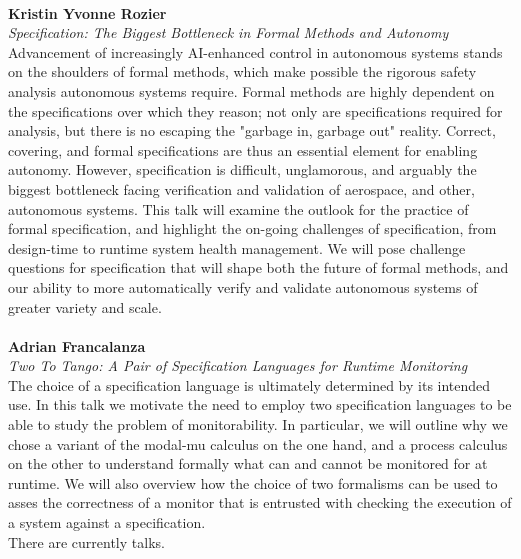 \documentclass{article}
\newcounter{talkc}
\newcommand{\talk}[3]{\stepcounter{talkc}
\vspace{0.5em}~\\
\noindent
\textbf{#1}\\ 
\noindent\emph{#2}\\ 
\noindent#3\\
}
\begin{document}
\talk{Kristin Yvonne Rozier}{Specification: The Biggest Bottleneck in Formal Methods and Autonomy}{Advancement of increasingly AI-enhanced control in autonomous systems stands on the shoulders of formal methods, which make possible the rigorous safety analysis autonomous systems require. Formal methods are highly dependent on the specifications over which they reason; not only are specifications required for analysis, but there is no escaping the "garbage in, garbage out" reality. Correct, covering, and formal specifications are thus an essential element for enabling autonomy. However, specification is difficult, unglamorous, and arguably the biggest bottleneck facing verification and validation of aerospace, and other, autonomous systems. This talk will examine the outlook for the practice of formal specification, and highlight the on-going challenges of specification, from design-time to runtime system health management. We will pose challenge questions for specification that will shape both the future of formal methods, and our ability to more automatically verify and validate autonomous systems of greater variety and scale.}
%
\talk{Adrian Francalanza}{Two To Tango: A Pair of Specification Languages for Runtime Monitoring}{The choice of a specification language is ultimately determined by its intended use.  In this talk we motivate the need to employ two specification languages to be able to study the problem of monitorability.  In particular, we will outline why we chose a variant of the modal-mu calculus on the one hand, and a process calculus on the other to understand formally what can and cannot be monitored for at runtime.  We will also overview how the choice of two formalisms can be used to asses the correctness of a monitor that is entrusted with checking the execution of a system against a specification.}

\vspace{1em}\noindent
There are currently  talks.
\end{document}
